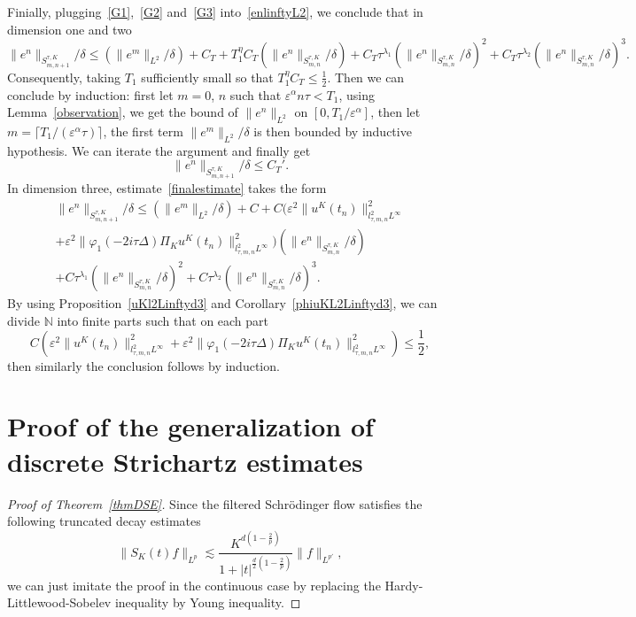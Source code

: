 \documentclass[10pt,a4paper]{article}
\begin{document}
  Finially, plugging~\eqref{G1},~\eqref{G2} and~\eqref{G3} into~\eqref{enlinftyL2}, we conclude that
  in dimension one and two
  \begin{equation}\label{finalestimate}
    \|e^n\|_{S^{\tau,K}_{m,n+1}}/\delta \leq (\|e^m\|_{L^2}/\delta) + C_T + T_1^\eta C_T (\|e^n\|_{S^{\tau,K}_{m,n}}/\delta) + 
    C_T \tau^{\lambda_1} (\|e^n\|_{S^{\tau,K}_{m,n}}/\delta)^2 + 
    C_T \tau^{\lambda_2}(\|e^n\|_{S^{\tau,K}_{m,n}}/\delta)^3.
  \end{equation}
  Consequently, taking \(T_1\) sufficiently small so that \(T_1^\eta C_T \leq
  \frac12 \). Then we can conclude by induction: first let \(m=0\), \(n\) such that
  \(\varepsilon^\alpha n \tau < T_1\), using Lemma~\ref{observation}, we get the
  bound of \(\|e^n\|_{L^2}\) on \([0,T_1/\varepsilon^\alpha]\), then let
  \(m=\lceil T_1/(\varepsilon^\alpha \tau)\rceil\), the first term \(\|e^m\|_{L^2}/\delta\) is
  then bounded by inductive hypothesis. We can iterate the argument and
  finally get 
  \[ \|e^n\|_{S^{\tau,K}_{m,n+1}}/\delta \leq C_T'. \]
  In dimension three, estimate~\eqref{finalestimate} takes the form
  \begin{multline}
    \|e^n\|_{S^{\tau,K}_{m,n+1}}/\delta \leq (\|e^m\|_{L^2}/\delta) + C + 
    C (\varepsilon^2 \|u^K(t_n)\|_{l^2_{\tau,m,n}L^\infty}^2 \\ +
    \varepsilon^2 
    \|\varphi_1(-2i\tau\Delta)\Pi_K u^K(t_n)\|_{l^2_{\tau,m,n}L^\infty}^2  ) 
    (\|e^n\|_{S^{\tau,K}_{m,n}}/\delta) \\  + 
    C \tau^{\lambda_1} (\|e^n\|_{S^{\tau,K}_{m,n}}/\delta)^2 + 
    C \tau^{\lambda_2}(\|e^n\|_{S^{\tau,K}_{m,n}}/\delta)^3.
  \end{multline}
  By using Proposition~\ref{uKl2Linftyd3} and Corollary~\ref{phiuKL2Linftyd3}, 
  we can divide \(\mathbb{N}\) into finite parts such that on each part
  \[C (\varepsilon^2 \|u^K(t_n)\|_{l^2_{\tau,m,n}L^\infty}^2 + \varepsilon^2 
  \|\varphi_1(-2i\tau\Delta)\Pi_K u^K(t_n)\|_{l^2_{\tau,m,n}L^\infty}^2) \leq
  \frac12,\] 
  then similarly the conclusion follows by induction.


  \section{Proof of the generalization of discrete Strichartz estimates}
  \begin{proof}[Proof of Theorem~\ref{thmDSE}]
    Since the filtered Schr\"odinger flow satisfies the following truncated
    decay estimates
    \[ \|S_K(t)f\|_{L^p} \lesssim
    \frac{K^{d(1-\frac2p)}}{1+|t|^{\frac{d}2(1-\frac2p)}}\|f\|_{L^{p'}},\]
    we can just imitate the proof in the continuous case by replacing the 
    Hardy-Littlewood-Sobelev inequality by Young inequality.
  \end{proof}
\end{document}
